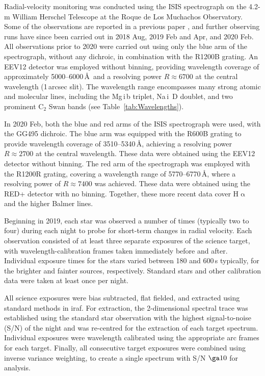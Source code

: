 \documentclass[fleqn,usenatbib,useAMS]{mnras}
\begin{document}
Radial-velocity monitoring was conducted using the ISIS spectrograph on the 4.2-m William Herschel Telescope at the Roque de Los Muchachos Observatory.  Some of the observations are reported in a previous paper \citep{Whitehouse18}, and further observing runs have since been carried out in 2018 Aug, 2019 Feb and Apr, and 2020 Feb.  All observations prior to 2020 were carried out using only the blue arm of the spectrograph, without any dichroic, in combination with the R1200B grating.  An EEV12 detector was employed without binning, providing wavelength coverage of approximately 5000--6000\,\AA\ and a resolving power $R\approx6700$ at the central wavelength (1\,arcsec slit).  The wavelength range encompasses many strong atomic and molecular lines, including the Mg\,{\sc i}\,b triplet, Na\,{\sc i}~D doublet, and two prominent C$_2$ Swan bands (see Table~\ref{tab:Wavelengths}).  

In 2020 Feb, both the blue and red arms of the ISIS spectrograph were used, with the GG495 dichroic.  The blue arm was equipped with the R600B grating to provide wavelength coverage of 3510--5340\,\AA, achieving a resolving power $R\approx2700$ at the central wavelength.  These data were obtained using the EEV12 detector without binning.  The red arm of the spectrograph was employed with the R1200R grating, covering a wavelength range of 5770--6770\,\AA, where a resolving power of $R\approx7400$ was achieved.  These data were obtained using the RED+ detector with no binning.  Together, these more recent data cover H$\upalpha$ and the higher Balmer lines.

Beginning in 2019, each star was observed a number of times (typically two to four) during each night to probe for short-term changes in radial velocity.  Each observation consisted of at least three separate exposures of the science target, with wavelength-calibration frames taken immediately before and after.  Individual exposure times for the stars varied between 180 and 600\,s typically, for the brighter and fainter sources, respectively.  Standard stars and other calibration data were taken at least once per night.

All science exposures were bias subtracted, flat fielded, and extracted using standard methods in {\sc iraf}.  For extraction, the 2-dimensional spectral trace was established using the standard star observation with the highest signal-to-noise (S/N) of the night and was re-centred for the extraction of each target spectrum.  Individual exposures were wavelength calibrated using the appropriate arc frames for each target.  Finally, all consecutive target exposures were combined using inverse variance weighting, to create a single spectrum with S/N $\ga10$ for analysis.
\end{document}

